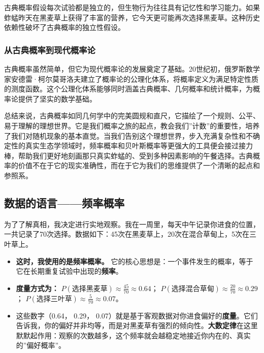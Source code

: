 \documentclass[
  twoside]{book}
\providecommand{\tightlist}{%
  \setlength{\itemsep}{0pt}\setlength{\parskip}{0pt}}
\begin{document}
古典概率假设每次试验都是独立的，但生物行为往往具有记忆性和学习能力。如果蚱蜢昨天在黑麦草上获得了丰富的营养，它今天更可能再次选择黑麦草。这种历史依赖性破坏了古典概率的独立性假设。

\hypertarget{ux4eceux53e4ux5178ux6982ux7387ux5230ux73b0ux4ee3ux6982ux7387ux8bba}{%
\subsubsection{从古典概率到现代概率论}\label{ux4eceux53e4ux5178ux6982ux7387ux5230ux73b0ux4ee3ux6982ux7387ux8bba}}

古典概率虽然简单，但它为现代概率论的发展奠定了基础。20世纪初，俄罗斯数学家安德雷·柯尔莫哥洛夫建立了概率论的公理化体系，将概率定义为满足特定性质的测度函数。这个公理化体系能够同时涵盖古典概率、几何概率和统计概率，为概率论提供了坚实的数学基础。

总结来说，古典概率如同几何学中的完美圆规和直尺，它描绘了一个规则、公平、易于理解的理想世界。它是我们概率之旅的起点，教会我们''计数''的重要性，培养了我们对随机现象的基本直觉。当我们告别这个理想世界，步入充满复杂性和不确定性的真实生态学领域时，频率概率和贝叶斯概率等更强大的工具便会接过接力棒，帮助我们更好地刻画那只真实蚱蜢的、受到多种因素影响的午餐选择。古典概率的价值不在于它的现实准确性，而在于它为我们的思维提供了一个清晰的起点和参照系。

\hypertarget{ux6570ux636eux7684ux8bedux8a00ux9891ux7387ux6982ux7387}{%
\subsection{数据的语言------频率概率}\label{ux6570ux636eux7684ux8bedux8a00ux9891ux7387ux6982ux7387}}

为了了解真相，我决定进行实地观察。我在一周里，每天中午记录你进食的位置，一共记录了70次选择。数据如下：45次在黑麦草上，20次在混合草甸上，5次在三叶草上。

\begin{itemize}
\tightlist
\item
  \textbf{这时，我使用的是频率概率。} 它的核心思想是：一个事件发生的概率，等于它在长期重复试验中出现的\textbf{频率}。
\item
  \textbf{度量方式为：} \(P(\text{选择黑麦草}) \approx \frac{45}{70} \approx 0.64\)； \(P(\text{选择混合草甸}) \approx \frac{20}{70} \approx 0.29\)； \(P(\text{选择三叶草}) \approx \frac{5}{70} \approx 0.07\)。
\item
  这些数字（0.64， 0.29， 0.07）就是基于客观数据对你进食偏好的\textbf{度量}。它们告诉我，你的偏好并非均等，而是对黑麦草有强烈的倾向性。\textbf{大数定律}在这里默默起作用：观察的次数越多，这个频率就会越稳定地接近你内在的、真实的''偏好概率''。
\end{itemize}
\end{document}
